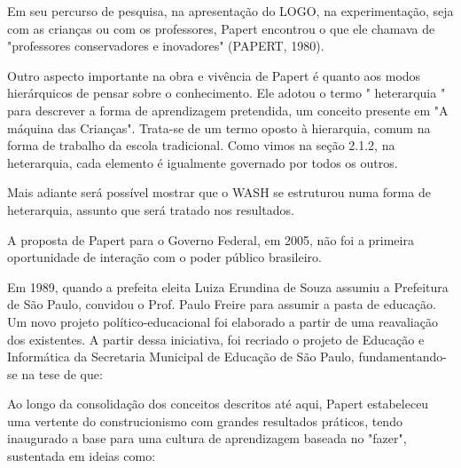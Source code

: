 Em seu percurso de pesquisa, na apresentação do LOGO, na experimentação, seja com as crianças ou com os professores, Papert encontrou o que ele chamava de "professores conservadores e  inovadores" (PAPERT, 1980).

Outro aspecto importante na obra e vivência de Papert é quanto aos modos hierárquicos de pensar sobre o conhecimento. Ele adotou o termo  " heterarquia " para descrever a forma de aprendizagem pretendida, um conceito presente em  "A máquina das Crianças". Trata-se de  um termo oposto à hierarquia, comum na forma de trabalho da escola tradicional. Como vimos na seção 2.1.2, na heterarquia, cada elemento é igualmente governado por todos os outros.

Mais adiante será possível mostrar que o WASH se estruturou numa forma de heterarquia, assunto que será tratado nos resultados.

A proposta de Papert para o Governo Federal, em 2005, não foi a primeira oportunidade de interação com o poder público brasileiro.

Em 1989, quando a prefeita eleita Luiza Erundina de Souza assumiu a Prefeitura de São Paulo, convidou o Prof. Paulo Freire para assumir a pasta de educação. Um novo projeto político-educacional foi elaborado a partir de uma reavaliação dos existentes. A partir dessa iniciativa, foi recriado o projeto de Educação e Informática da Secretaria Municipal de Educação de São Paulo, fundamentando-se na tese de que:


\noindent\begin{center}\mbox{\centering{}}\end{center}


Ao longo da consolidação dos conceitos descritos até aqui, Papert estabeleceu uma vertente do construcionismo com grandes resultados práticos, tendo inaugurado a base para uma cultura de aprendizagem baseada no "fazer", sustentada em ideias como:


